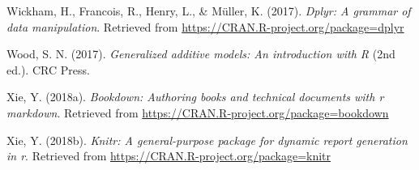 \documentclass [11pt, proquest] {uwthesis}[2015/03/03]
\begin{document}
\hypertarget{ref-R-dplyr}{}
Wickham, H., Francois, R., Henry, L., \& Müller, K. (2017). \emph{Dplyr:
A grammar of data manipulation}. Retrieved from
\url{https://CRAN.R-project.org/package=dplyr}

\hypertarget{ref-Wood2017}{}
Wood, S. N. (2017). \emph{Generalized additive models: An introduction
with R} (2nd ed.). CRC Press.

\hypertarget{ref-R-bookdown}{}
Xie, Y. (2018a). \emph{Bookdown: Authoring books and technical documents
with r markdown}. Retrieved from
\url{https://CRAN.R-project.org/package=bookdown}

\hypertarget{ref-R-knitr}{}
Xie, Y. (2018b). \emph{Knitr: A general-purpose package for dynamic
report generation in r}. Retrieved from
\url{https://CRAN.R-project.org/package=knitr}
\end{document}
